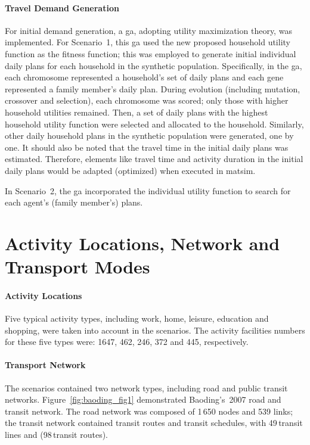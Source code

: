 \paragraph{Travel Demand Generation}
For initial demand generation, a \gls{ga}, adopting utility maximization theory, was implemented. 
For Scenario~1, this \gls{ga} used the new proposed household utility function as the fitness function; this was employed to generate initial individual daily plans for each household in the synthetic population. 
Specifically, in the \gls{ga}, each chromosome represented a household's set of daily plans and each gene represented a family member's daily plan. 
During evolution (including mutation, crossover and selection), each chromosome was scored; only those with higher household utilities remained. 
Then, a set of daily plans with the highest household utility function were selected and allocated to the household. 
Similarly, other daily household plans in the synthetic population were generated, one by one. 
It should also be noted that the travel time in the initial daily plans was estimated. 
Therefore, elements like travel time and activity duration in the initial daily plans would be adapted (optimized) when executed in \gls{matsim}.

In Scenario~2, the \gls{ga} incorporated the individual utility function to search for each agent's (family member's) plans.

\section{Activity Locations, Network and Transport Modes}
\paragraph{Activity Locations} Five typical activity types, including work, home, leisure, education and shopping, were taken into account in the scenarios. 
The activity facilities numbers for these five types were: 1647, 462, 246, 372 and 445, respectively. 

\paragraph{Transport Network} The scenarios contained two network types, including road and public transit networks. 
Figure~\ref{fig:baoding_fig1} demonstrated Baoding's~2007 road and transit network. The road network was composed of 1\,650 nodes and 539 links; the transit network contained transit routes and transit schedules, with  49\,transit lines and (98\,transit routes). 

